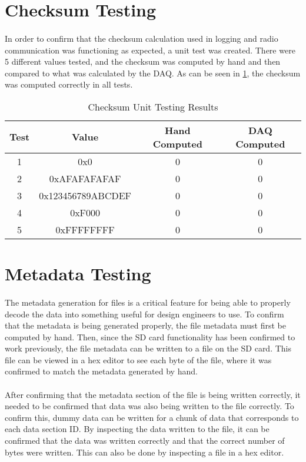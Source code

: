 \section{Checksum Testing}

\paragraph{}
In order to confirm that the checksum calculation used in logging and radio communication was functioning as expected, a unit test was created.
There were 5 different values tested, and the checksum was computed by hand and then compared to what was calculated by the DAQ.
As can be seen in \cref{tab:ChecksumTesting}, the checksum was computed correctly in all tests.

\begin{table}[H] \label{tab:ChecksumTesting}
\caption{Checksum Unit Testing Results}
\centering
\begin{tabular}{c c c c}
\hline\hline
Test & Value & Hand Computed & DAQ Computed \\ [0.5ex]
\hline
1 & 0x0 & 0 & 0 \\
2 & 0xAFAFAFAFAF & 0 & 0 \\
3 & 0x123456789ABCDEF & 0 & 0 \\
4 & 0xF000 & 0 & 0 \\
5 & 0xFFFFFFFF & 0 & 0 \\ [1ex]
\hline
\end{tabular}
\end{table}

\section{Metadata Testing}

\paragraph{}
The metadata generation for files is a critical feature for being able to properly decode the data into something useful for design engineers to use.
To confirm that the metadata is being generated properly, the file metadata must first be computed by hand.
Then, since the SD card functionality has been confirmed to work previously, the file metadata can be written to a file on the SD card.
This file can be viewed in a hex editor to see each byte of the file, where it was confirmed to match the metadata generated by hand.

\paragraph{}
After confirming that the metadata section of the file is being written correctly, it needed to be confirmed that data was also being written to the file correctly.
To confirm this, dummy data can be written for a chunk of data that corresponds to each data section ID.
By inspecting the data written to the file, it can be confirmed that the data was written correctly and that the correct number of bytes were written.
This can also be done by inspecting a file in a hex editor.

